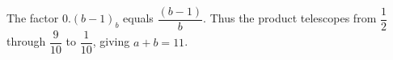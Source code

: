 The factor $0.(b-1)_b$ equals $\dfrac{(b-1)}{b}$. Thus the product telescopes from $\dfrac{1}{2}$ through $\dfrac{9}{10}$ to $\dfrac{1}{10}$, giving $a+b=\boxed{11}$.
